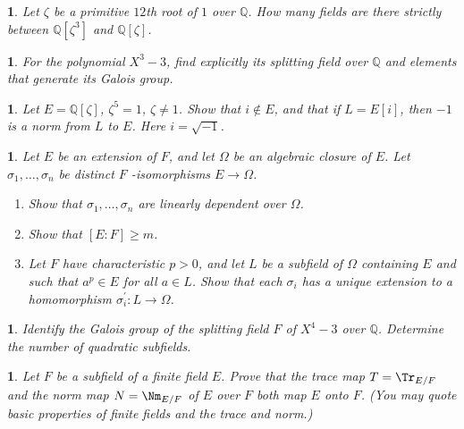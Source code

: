 \documentclass[a4paper,11pt,final,openany]{memoir}
\newtheorem{exercise}[Y]{}
\theoremstyle{nonumberplain}
\begin{document}
\begin{exercise}
\label{x42} Let $\zeta$ be a primitive $12$th root of $1$ over ${\mathbb{Q}}$.
How many fields are there strictly between ${\mathbb{Q}}[\zeta^{3}]$ and
${\mathbb{Q}}[\zeta]$.
\end{exercise}

\begin{exercise}
\label{x43} For the polynomial $X^{3}-3$, find explicitly its splitting field
over ${\mathbb{Q}}$ and elements that generate its Galois group.
\end{exercise}

\begin{exercise}
\label{x44} Let $E={\mathbb{Q}}[\zeta]$, $\zeta^{5}=1$, $\zeta\neq1$. Show
that $i\notin E$, and that if $L=E[i]$, then $-1$ is a norm from $L$ to $E$.
Here $i=\sqrt{-1}$.
\end{exercise}

\begin{exercise}
\label{x45} Let $E$ be an extension of $F$, and let $\Omega$ be an algebraic
closure of $E$. Let $\sigma_{1},\ldots,\sigma_{n}$ be distinct $F$%
-isomorphisms $E\to\Omega$.

\begin{enumerate}
\item Show that $\sigma_{1},\ldots,\sigma_{n}$ are linearly dependent over
$\Omega$.

\item Show that $[E\colon F]\geq m$.

\item Let $F$ have characteristic $p>0$, and let $L$ be a subfield of $\Omega$
containing $E$ and such that $a^{p}\in E$ for all $a\in L$. Show that each
$\sigma_{i}$ has a unique extension to a homomorphism $\sigma_{i}^{\prime
}\colon L\rightarrow\Omega$.
\end{enumerate}
\end{exercise}

\begin{exercise}
\label{x46} Identify the Galois group of the splitting field $F$ of $X^{4}-3$
over ${\mathbb{Q}}$. Determine the number of quadratic subfields.
\end{exercise}

\begin{exercise}
\label{x47} Let $F$ be a subfield of a finite field $E$. Prove that the trace
map $T=\Tr_{E/F}$ and the norm map $N=\Nm_{E/F}$ of $E$ over $F$ both map $E$
\textit{onto }$F$. (You may quote basic properties of finite fields and the
trace and norm.)
\end{exercise}
\end{document}
